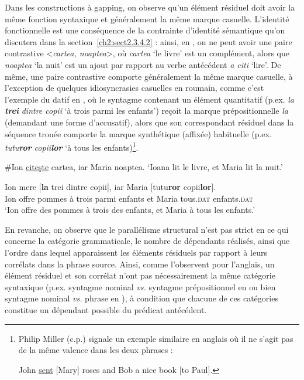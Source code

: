 Dans les constructions à gapping, on observe qu’un élément résiduel doit avoir la même fonction syntaxique et généralement la même marque casuelle. L’identité fonctionnelle est une conséquence de la contrainte d’identité sémantique qu’on discutera dans la section~\ref{ch2:sect2.3.4.2} : ainsi, en , on ne peut avoir une paire contrastive <\textit{cartea, noaptea}>, où \textit{cartea} ‘le livre’ est un complément, alors que \textit{noaptea} ‘la nuit’ est un ajout par rapport au verbe antécédent \textit{a citi} ‘lire’. De même, une paire contrastive comporte généralement la même marque casuelle, à l’exception de quelques idiosyncrasies casuelles en roumain, comme c’est l’exemple du datif en , où le syntagme contenant un élément quantitatif (p.ex. \textit{la} \textbf{\textit{trei} }\textit{dintre copii} ‘à trois parmi les enfants’) reçoit la marque prépositionnelle \textit{la} (demandant une forme d’accusatif), alors que son correspondant résiduel dans la séquence trouée comporte la marque synthétique (affixée) habituelle (p.ex. \textit{tutu}\textbf{\textit{ror}} \textit{copii}\textbf{\textit{lor}} ‘à tous les enfants)\footnote{
 Philip Miller (c.p.) signale un exemple similaire en anglais où il ne s’agit pas de la même valence dans les deux phrases :
 
 \ea
 John \uline{sent} [Mary] roses and Bob a nice book [to Paul].
 \z
}.


\ea
\ea \#Ion \uline{citeşte} cartea, iar Maria noaptea. \label{ch2:ex132a}
\glt  ‘Ioana lit le livre, et Maria lit la nuit.’ 

\ex  
\gll Ion    mere  [\textbf{la}  trei  dintre  copii],  iar  Maria  [tutu\textbf{ror}  copii\textbf{lor}]. \label{ch2:ex132b}\\
Ion  offre  pommes  à  trois  parmi  enfants  et  Maria  tous.\textsc{dat} enfants.\textsc{dat}\\ 
\glt ‘Ion offre des pommes à trois des enfants, et Maria à tous les enfants.’ 
\z
\z

En revanche, on observe que le parallélisme structural n’est pas strict en ce qui concerne la catégorie grammaticale, le nombre de dépendants réalisés, ainsi que l’ordre dans lequel apparaissent les éléments résiduels par rapport à leurs corrélats dans la phrase source. Ainsi, comme \citet{SagEtAl1985} l’observent pour l’anglais, un élément résiduel et son corrélat n’ont pas nécessairement la même catégorie syntaxique (p.ex. syntagme nominal \textit{vs.} syntagme prépositionnel en  ou bien syntagme nominal \textit{vs.} phrase en ), à condition que chacune de ces catégories constitue un dépendant possible du prédicat antécédent. 

